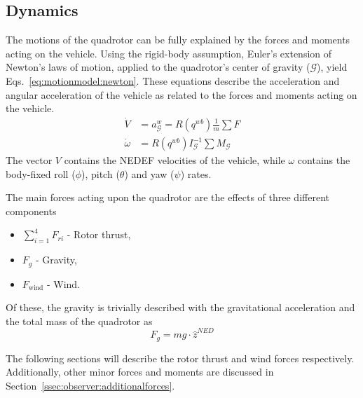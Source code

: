     \subsection{Dynamics}
        The motions of the quadrotor can be fully explained by the
        forces and moments acting on the vehicle. Using the rigid-body assumption,
        Euler's extension of Newton's laws of motion, applied to the
        quadrotor's center of gravity ($\mathcal{G}$), yield Eqs.~\ref{eq:motionmodel:newton}.
        These equations describe the acceleration and angular acceleration of the vehicle
        as related to the forces and moments acting on the vehicle.
        \begin{subequations}
        \label{eq:motionmodel:newton}
            \begin{align}
                \dot{V} &= a^{w}_{\mathcal{G}} = R(q^{wb})\frac{1}{m}\sum F \\
                \dot{\omega} &= R(q^{wb})I_{\mathcal{G}}^{-1}\sum M_{\mathcal{G}}
            \end{align}
        \end{subequations}
        The vector $V$ contains the NEDEF velocities of the vehicle, while $\omega${}
        contains the body-fixed roll ($\phi$), pitch ($\theta$) and yaw ($\psi$) rates.

        The main forces acting upon the quadrotor are the effects of three different components
        \begin{itemize}
            \item $\sum_{i=1}^{4}F_{ri}$ - Rotor thrust,
            \item $F_{g}$ - Gravity,
            \item $F_{\text{wind}}$ - Wind.
        \end{itemize}

        Of these, the gravity is trivially described with the
        gravitational acceleration and the total mass of the quadrotor as
        \begin{equation}
            F_{g} = mg\cdot \hat{z}^{NED}
        \end{equation}

        The following sections will describe the rotor thrust and wind forces respectively.
        Additionally, other minor forces and moments are discussed in
        Section~\ref{ssec:observer:additionalforces}.

        
        
        
